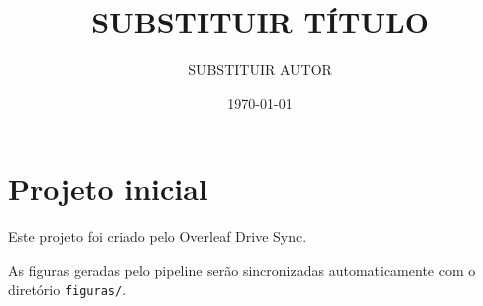 \documentclass[12pt,a4paper]{article}
\title{SUBSTITUIR TÍTULO}
\author{SUBSTITUIR AUTOR}
\date{\today}
\begin{document}
\maketitle

\section{Projeto inicial}

Este projeto foi criado pelo Overleaf Drive Sync.

As figuras geradas pelo pipeline serão sincronizadas automaticamente
com o diretório \texttt{figuras/}.
\end{document}

